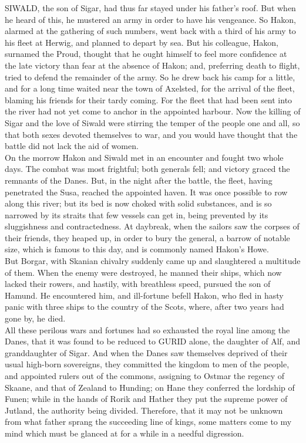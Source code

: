 \documentclass[10pt,a4paper]{report}
\begin{document}
SIWALD, the son of Sigar, had thus far stayed under his father's roof. But when he heard of this, he mustered an army in order to have his vengeance. So Hakon, alarmed at the gathering of such numbers, went back with a third of his army to his fleet at Herwig, and planned to depart by sea. But his colleague, Hakon, surnamed the Proud, thought that he ought himself to feel more confidence at the late victory than fear at the absence of Hakon; and, preferring death to flight, tried to defend the remainder of the army. So he drew back his camp for a little, and for a long time waited near the town of Axelsted, for the arrival of the fleet, blaming his friends for their tardy coming. For the fleet that had been sent into the river had not yet come to anchor in the appointed harbour. Now the killing of Sigar and the love of Siwald were stirring the temper of the people one and all, so that both sexes devoted themselves to war, and you would have thought that the battle did not lack the aid of women.\\

On the morrow Hakon and Siwald met in an encounter and fought two whole days. The combat was most frightful; both generals fell; and victory graced the remnants of the Danes. But, in the night after the battle, the fleet, having penetrated the Susa, reached the appointed haven. It was once possible to row along this river; but its bed is now choked with solid substances, and is so narrowed by its straits that few vessels can get in, being prevented by its sluggishness and contractedness. At daybreak, when the sailors saw the corpses of their friends, they heaped up, in order to bury the general, a barrow of notable size, which is famous to this day, and is commonly named Hakon's Howe.\\

But Borgar, with Skanian chivalry suddenly came up and slaughtered a multitude of them. When the enemy were destroyed, he manned their ships, which now lacked their rowers, and hastily, with breathless speed, pursued the son of Hamund. He encountered him, and ill-fortune befell Hakon, who fled in hasty panic with three ships to the country of the Scots, where, after two years had gone by, he died.\\

All these perilous wars and fortunes had so exhausted the royal line among the Danes, that it was found to be reduced to GURID alone, the daughter of Alf, and granddaughter of Sigar. And when the Danes saw themselves deprived of their usual high-born sovereigns, they committed the kingdom to men of the people, and appointed rulers out of the commons, assigning to Ostmar the regency of Skaane, and that of Zealand to Hunding; on Hane they conferred the lordship of Funen; while in the hands of Rorik and Hather they put the supreme power of Jutland, the authority being divided. Therefore, that it may not be unknown from what father sprang the succeeding line of kings, some matters come to my mind which must be glanced at for a while in a needful digression.\\
\end{document}
